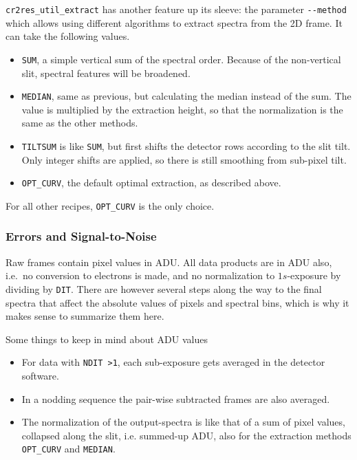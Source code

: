 \verb!cr2res_util_extract! has another feature up its sleeve: the parameter
\verb!--method! which allows using different algorithms to extract spectra from
the 2D frame. It can take the following values.
\begin{itemize}
    \item \verb!SUM!, a simple vertical sum of the spectral order. Because of
    the non-vertical slit, spectral features will be broadened.
    \item \verb!MEDIAN!, same as previous, but calculating the median instead of
    the sum. The value is multiplied by the extraction height, so that the
    normalization is the same as the other methods.
    \item \verb!TILTSUM! is like \verb!SUM!, but first shifts the detector rows
    according to the slit tilt. Only integer shifts are applied, so there is
    still smoothing from sub-pixel tilt.
    \item \verb!OPT_CURV!, the default optimal extraction, as described above.
\end{itemize}

For all other recipes, \verb!OPT_CURV! is the only choice.

\subsubsection{Errors and Signal-to-Noise}
\label{sec:errors}

Raw frames contain pixel values in ADU. All data products are in ADU also,
i.e.~no conversion to electrons is made, and no normalization to $1s$-exposure by
dividing by \verb!DIT!. There are however several steps along the way to the
final spectra that affect the absolute values of pixels and spectral bins, which
is why it makes sense to summarize them here.

Some things to keep in mind about ADU values
\begin{itemize}
    \item For data with \verb!NDIT >1!, each sub-exposure gets averaged in the
    detector software.
    \item In a nodding sequence the pair-wise subtracted frames are also
    averaged.
    \item The normalization of the output-spectra is like that of a sum of pixel
    values, collapsed along the slit, i.e. summed-up ADU, also for the
    extraction methods \verb!OPT_CURV! and \verb!MEDIAN!.
\end{itemize}


